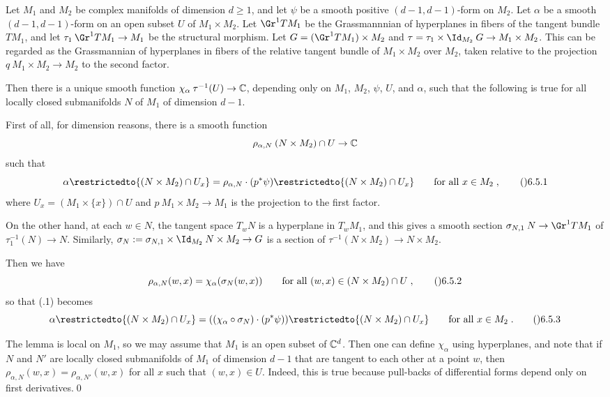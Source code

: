  Let $M_1$ and $M_2$ be complex manifolds of dimension $d\ge1$,
and let $\psi$ be a smooth positive $(d-1,d-1)$\snug-form on $M_2$.
Let $\alpha$ be a smooth $(d-1,d-1)$\snug-form
on an open subset $U$ of $M_1\times M_2$.  Let $\Gr^1 TM_1$ be the
Grassmannnian of hyperplanes in fibers of the tangent bundle $TM_1$,
and let $\tau_1\:\Gr^1 TM_1\to M_1$ be the structural morphism.  Let
$G=(\Gr^1 TM_1)\times M_2$ and $\tau=\tau_1\times\Id_{M_2}\:G\to M_1\times M_2$.
This can be regarded as the Grassmannian of hyperplanes
in fibers of the relative tangent bundle of $M_1\times M_2$ over $M_2$,
taken relative to the projection $q\:M_1\times M_2\to M_2$
to the second factor.

Then there is a unique smooth function $\chi_\alpha\:\tau^{-1}(U)\to\Bbb C$,
depending only on $M_1$, $M_2$, $\psi$, $U$, and $\alpha$, such that
the following is true for all locally closed submanifolds $N$ of $M_1$
of dimension $d-1$.

First of all, for dimension reasons, there is a smooth function
$$\rho_{\alpha,N}\:(N\times M_2)\cap U\to\Bbb C$$
such that
$$\alpha\restrictedto{(N\times M_2)\cap U_x}
  = \rho_{\alpha,N} \cdot (p^{*}\psi)\restrictedto{(N\times M_2)\cap U_x}
  \qquad\text{for all $x\in M_2$}\;,\tag\06.5.1$$
where $U_x=(M_1\times\{x\})\cap U$ and $p\:M_1\times M_2\to M_1$ is
the projection to the first factor.

On the other hand, at each $w\in N$, the tangent space $T_wN$ is a hyperplane
in $T_wM_1$, and this gives a smooth section $\sigma_{N,1}\:N\to\Gr^1 TM_1$
of $\tau_1^{-1}(N)\to N$.
Similarly, $\sigma_N:=\sigma_{N,1}\times\Id_{M_2}\:N\times M_2\to G$
is a section of $\tau^{-1}(N\times M_2)\to N\times M_2$.

Then we have
$$\rho_{\alpha,N}(w,x) = \chi_\alpha(\sigma_N(w,x))
  \qquad\text{for all $(w,x)\in(N\times M_2)\cap U$}\;,\tag\06.5.2$$
so that (.1) becomes
$$\alpha\restrictedto{(N\times M_2)\cap U_x}
  = ((\chi_\alpha\circ\sigma_N) \cdot (p^{*}\psi))
  \restrictedto{(N\times M_2)\cap U_x}
  \qquad\text{for all $x\in M_2$}\;.\tag\06.5.3$$
\endit

  The lemma is local on $M_1$,
so we may assume that $M_1$ is an open subset of $\Bbb C^d$.
Then one can define $\chi_\alpha$ using hyperplanes, and note that
if $N$ and $N'$ are locally closed submanifolds of $M_1$ of dimension $d-1$
that are tangent to each other at a point $w$,
then $\rho_{\alpha,N}(w,x)=\rho_{\alpha,N'}(w,x)$
for all $x$ such that $(w,x)\in U$.  Indeed, this is true because
pull-backs of differential forms depend only on first derivatives.\qed
\enddemo

